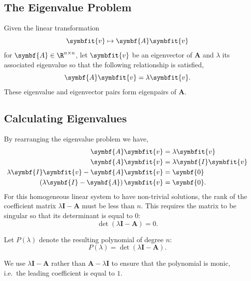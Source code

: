 \documentclass{article}
\begin{document}
\subsection{The Eigenvalue Problem}
Given the linear transformation
\begin{equation*}
    \symbfit{v} \mapsto \symbf{A} \symbfit{v}
\end{equation*}
for \(\symbf{A}\in\R^{n \times n}\), let \(\symbfit{v}\) be an eigenvector of \(\symbf{A}\)
and \(\lambda\) its associated eigenvalue so that the following relationship is
satisfied,
\begin{equation*}
    \symbf{A}\symbfit{v} = \lambda \symbfit{v}.
\end{equation*}
These eigenvalue and eigenvector pairs form eigenpairs of \(\symbf{A}\).
\subsection{Calculating Eigenvalues}
By rearranging the eigenvalue problem we have,
\begin{align*}
    \symbf{A}\symbfit{v}                                    & = \lambda \symbfit{v}           \\
    \symbf{A}\symbfit{v}                                    & = \lambda \symbf{I} \symbfit{v} \\
    \lambda \symbf{I} \symbfit{v} - \symbf{A}\symbfit{v}    & = \symbf{0}                     \\
    \left( \lambda \symbf{I} - \symbf{A} \right)\symbfit{v} & = \symbf{0}.
\end{align*}
For this homogeneous linear system to have non-trivial solutions, the rank of the coefficient matrix \(\lambda \symbf{I} - \symbf{A}\)
must be less than \(n\). This requires the matrix to be singular so that its determinant is equal to \(0\):
\begin{equation*}
    \det{\left( \lambda \symbf{I} - \symbf{A} \right)} = 0.
\end{equation*}
\begin{definition}
    Let \(P\left( \lambda \right)\) denote the resulting polynomial of degree \(n\):
    \begin{equation*}
        P\left( \lambda \right) = \det{\left( \lambda \symbf{I} - \symbf{A} \right)}.
    \end{equation*}
\end{definition}
We use \(\lambda \symbf{I} - \symbf{A}\) rather than \(\symbf{A} - \lambda \symbf{I}\) to ensure that the polynomial is monic,
i.e.\ the leading coefficient is equal to \(1\).
\end{document}
